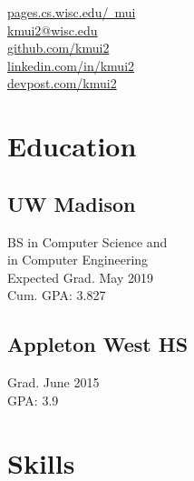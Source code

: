 \documentclass[]{hieudo-build}
\begin{document}
%
%
{
	\faGlobe \href{http://pages.cs.wisc.edu/~mui/}{ pages.cs.wisc.edu/~mui}\\
	\faEnvelope \href{mailto:kmui2@wisc.edu}{ kmui2@wisc.edu}\\
	\faGithub \href{https://github.com/kmui2}{   github.com/kmui2}\\
	\faLinkedinSquare \href{https://www.linkedin.com/in/kmui2}{   linkedin.com/in/kmui2}\\
    \faFile \href{https://devpost.com/kmui2}{devpost.com/kmui2}
}
    
%
%
\begin{minipage}[t]{0.34\textwidth} 

\section{Education} 

\subsection{UW Madison}
BS in Computer Science  and\\
in Computer Engineering \\
Expected Grad. May 2019 \\
Cum. GPA: 3.827\\
\sectionsep

\subsection{Appleton West HS}
Grad. June 2015 \\
GPA: 3.9 \\
\sectionsep

\section{Skills}


\end{minipage}
\end{document}
